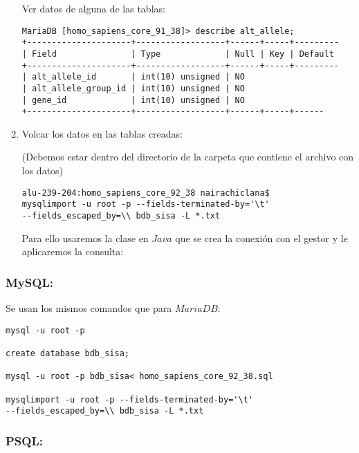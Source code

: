 \documentclass[12pt,a4paper]{article}
\begin{document}
\begin{enumerate}
\begin{verbatim}
\end{verbatim}

Ver datos de alguna de las tablas:
\begin{verbatim}
MariaDB [homo_sapiens_core_91_38]> describe alt_allele;
+---------------------+------------------+------+-----+---------
| Field               | Type             | Null | Key | Default 
+---------------------+------------------+------+-----+---------
| alt_allele_id       | int(10) unsigned | NO 
| alt_allele_group_id | int(10) unsigned | NO 
| gene_id             | int(10) unsigned | NO 
+---------------------+------------------+------+-----+------
\end{verbatim}

\item Volcar los datos en las tablas creadas:

(Debemos estar dentro del directorio de la carpeta que contiene el archivo con los datos)

\begin{verbatim}
alu-239-204:homo_sapiens_core_92_38 nairachiclana$ 
mysqlimport -u root -p --fields-terminated-by='\t' 
--fields_escaped_by=\\ bdb_sisa -L *.txt
\end{verbatim}

Para ello usaremos la clase en $Java$ que se crea la conexión con el gestor y le aplicaremos la consulta:



\end{enumerate}

\newpage
\subsubsection{MySQL:} \label{pto212}
Se usan los mismos comandos que para $MariaDB:$

\begin{verbatim}
mysql -u root -p

create database bdb_sisa;

mysql -u root -p bdb_sisa< homo_sapiens_core_92_38.sql 

mysqlimport -u root -p --fields-terminated-by='\t'  
--fields_escaped_by=\\ bdb_sisa -L *.txt
\end{verbatim}

\subsubsection{PSQL:} \label{pto213}
\end{document}

